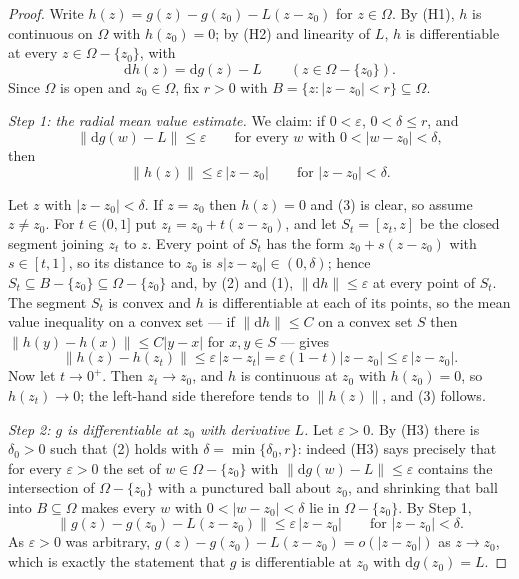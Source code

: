 \begin{proof}
Write $h(z)=g(z)-g(z_0)-L(z-z_0)$ for $z\in\Omega$.  By (H1), $h$ is continuous
on $\Omega$ with $h(z_0)=0$; by (H2) and linearity of $L$, $h$ is
differentiable at every $z\in\Omega-\{z_0\}$, with
\begin{equation}\tag{1}
  \mathrm{d}h(z)=\mathrm{d}g(z)-L\qquad(z\in\Omega-\{z_0\}).
\end{equation}
Since $\Omega$ is open and $z_0\in\Omega$, fix $r>0$ with
$B=\{z:|z-z_0|<r\}\subseteq\Omega$.

\emph{Step 1: the radial mean value estimate.}  We claim: if $0<\varepsilon$,
$0<\delta\le r$, and
\begin{equation}\tag{2}
  \bigl\|\mathrm{d}g(w)-L\bigr\|\le\varepsilon\qquad
  \text{for every }w\text{ with }0<|w-z_0|<\delta ,
\end{equation}
then
\begin{equation}\tag{3}
  \bigl\|h(z)\bigr\|\le\varepsilon\,|z-z_0|\qquad\text{for }|z-z_0|<\delta .
\end{equation}

Let $z$ with $|z-z_0|<\delta$.  If $z=z_0$ then $h(z)=0$ and (3) is clear, so
assume $z\neq z_0$.  For $t\in(0,1]$ put $z_t=z_0+t(z-z_0)$, and let
$S_t=[z_t,z]$ be the closed segment joining $z_t$ to $z$.  Every point of
$S_t$ has the form $z_0+s(z-z_0)$ with $s\in[t,1]$, so its distance to $z_0$ is
$s|z-z_0|\in(0,\delta)$; hence $S_t\subseteq B-\{z_0\}\subseteq\Omega-\{z_0\}$
and, by (2) and (1), $\|\mathrm{d}h\|\le\varepsilon$ at every point of $S_t$.
The segment $S_t$ is convex and $h$ is differentiable at each of its points, so
the mean value inequality on a convex set --- if $\|\mathrm{d}h\|\le C$ on a
convex set $S$ then $\|h(y)-h(x)\|\le C|y-x|$ for $x,y\in S$ --- gives
\[
  \bigl\|h(z)-h(z_t)\bigr\|\le\varepsilon\,|z-z_t|
  =\varepsilon(1-t)|z-z_0|\le\varepsilon\,|z-z_0| .
\]
Now let $t\to0^{+}$.  Then $z_t\to z_0$, and $h$ is continuous at $z_0$ with
$h(z_0)=0$, so $h(z_t)\to0$; the left-hand side therefore tends to
$\|h(z)\|$, and (3) follows.

\emph{Step 2: $g$ is differentiable at $z_0$ with derivative $L$.}  Let
$\varepsilon>0$.  By (H3) there is $\delta_0>0$ such that (2) holds with
$\delta=\min\{\delta_0,r\}$: indeed (H3) says precisely that for every
$\varepsilon>0$ the set of $w\in\Omega-\{z_0\}$ with
$\|\mathrm{d}g(w)-L\|\le\varepsilon$ contains the intersection of
$\Omega-\{z_0\}$ with a punctured ball about $z_0$, and shrinking that ball
into $B\subseteq\Omega$ makes every $w$ with $0<|w-z_0|<\delta$ lie in
$\Omega-\{z_0\}$.  By Step 1,
\[
  \bigl\|g(z)-g(z_0)-L(z-z_0)\bigr\|\le\varepsilon\,|z-z_0|
  \qquad\text{for }|z-z_0|<\delta .
\]
As $\varepsilon>0$ was arbitrary, $g(z)-g(z_0)-L(z-z_0)=o(|z-z_0|)$ as
$z\to z_0$, which is exactly the statement that $g$ is differentiable at $z_0$
with $\mathrm{d}g(z_0)=L$.


\end{proof}
